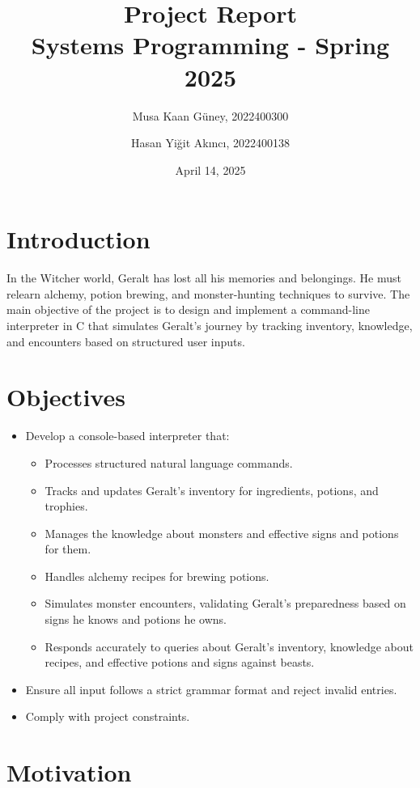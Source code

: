 \documentclass{article}
\title{Project Report\\
    \large Systems Programming - Spring 2025}
\author{Musa Kaan Güney, 2022400300 
    \and 
    Hasan Yiğit Akıncı, 2022400138}
\date{April 14, 2025}
\begin{document}
\maketitle

\section{Introduction}

In the Witcher world, Geralt has lost all his memories and belongings. He must relearn alchemy, potion brewing, and monster-hunting techniques to survive. The main objective of the project is to design and implement a command-line interpreter in C that simulates Geralt’s journey by tracking inventory, knowledge, and encounters based on structured user inputs.

\section*{Objectives}

\begin{itemize}
    \item Develop a console-based interpreter that:
    \begin{itemize}
        \item Processes structured natural language commands.
        \item Tracks and updates Geralt’s inventory for ingredients, potions, and trophies.
        \item Manages the knowledge about monsters and effective signs and potions for them.
        \item Handles alchemy recipes for brewing potions.
        \item Simulates monster encounters, validating Geralt’s preparedness based on signs he knows and potions he owns.
        \item Responds accurately to queries about Geralt's inventory, knowledge about recipes, and effective potions and signs against beasts.
    \end{itemize}
    \item Ensure all input follows a strict grammar format and reject invalid entries.
    \item Comply with project constraints.
\end{itemize}

\section*{Motivation}
\end{document}
